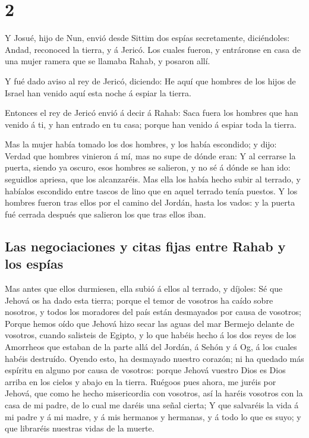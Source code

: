 \hypertarget{section-1}{%
\section{2}\label{section-1}}

 Y Josué, hijo de Nun, envió desde Sittim dos espías
secretamente, diciéndoles: Andad, reconoced la tierra, y á Jericó. Los
cuales fueron, y entráronse en casa de una mujer ramera que se llamaba
Rahab, y posaron allí.

 Y fué dado aviso al rey de Jericó, diciendo: He aquí que
hombres de los hijos de Israel han venido aquí esta noche á espiar la
tierra.

 Entonces el rey de Jericó envió á decir á Rahab: Saca
fuera los hombres que han venido á ti, y han entrado en tu casa; porque
han venido á espiar toda la tierra.

 Mas la mujer había tomado los dos hombres, y los había
escondido; y dijo: Verdad que hombres vinieron á mí, mas no supe de
dónde eran:  Y al cerrarse la puerta, siendo ya oscuro,
esos hombres se salieron, y no sé á dónde se han ido: seguidlos apriesa,
que los alcanzaréis.  Mas ella los había hecho subir al
terrado, y habíalos escondido entre tascos de lino que en aquel terrado
tenía puestos.  Y los hombres fueron tras ellos por el
camino del Jordán, hasta los vados: y la puerta fué cerrada después que
salieron los que tras ellos iban.

\hypertarget{las-negociaciones-y-citas-fijas-entre-rahab-y-los-espuxedas}{%
\subsection{Las negociaciones y citas fijas entre Rahab y los
espías}\label{las-negociaciones-y-citas-fijas-entre-rahab-y-los-espuxedas}}

 Mas antes que ellos durmiesen, ella subió á ellos al
terrado, y díjoles:  Sé que Jehová os ha dado esta tierra;
porque el temor de vosotros ha caído sobre nosotros, y todos los
moradores del país están desmayados por causa de vosotros;
 Porque hemos oído que Jehová hizo secar las aguas del
mar Bermejo delante de vosotros, cuando salisteis de Egipto, y lo que
habéis hecho á los dos reyes de los Amorrheos que estaban de la parte
allá del Jordán, á Sehón y á Og, á los cuales habéis destruído.
 Oyendo esto, ha desmayado nuestro corazón; ni ha quedado
más espíritu en alguno por causa de vosotros: porque Jehová vuestro Dios
es Dios arriba en los cielos y abajo en la tierra. 
Ruégoos pues ahora, me juréis por Jehová, que como he hecho misericordia
con vosotros, así la haréis vosotros con la casa de mi padre, de lo cual
me daréis una señal cierta;  Y que salvaréis la vida á mi
padre y á mi madre, y á mis hermanos y hermanas, y á todo lo que es
suyo; y que libraréis nuestras vidas de la muerte.

